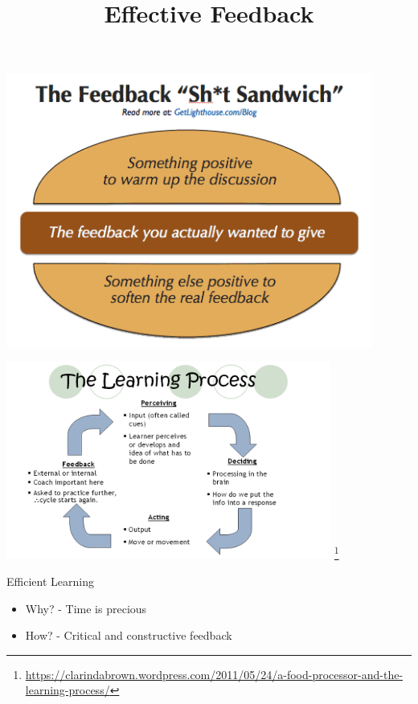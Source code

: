 \documentclass[aspectratio=169]{beamer}
\title{Effective Feedback}
\institute{Engineers for Exploration, UC San Diego}
\begin{document}
\maketitle
\begin{frame}
    \centering
    \includegraphics[height=0.9\textheight,width=0.9\textwidth,keepaspectratio]{04_shit_sandwich.png}
\end{frame}
\begin{frame}
    \centering
    \includegraphics[height=0.8\textheight,width=0.8\textwidth,keepaspectratio]{04_learning_process.png} \footnote{\url{https://clarindabrown.wordpress.com/2011/05/24/a-food-processor-and-the-learning-process/}}
\end{frame}
\begin{frame}{Efficient Learning}
    \begin{itemize}
        \item Why? - Time is precious
        \item How? - Critical and constructive feedback
    \end{itemize}
\end{frame}
\end{document}
